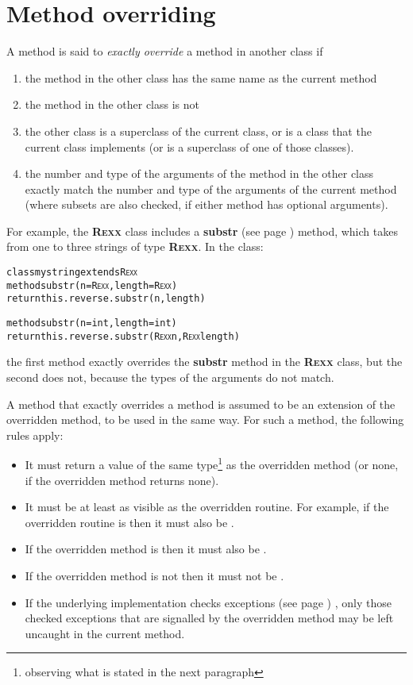 \section{Method overriding}\label{refoverrid}
 
A method is said to \emph{exactly override} a method in another class
if
\begin{enumerate}
\item the method in the other class has the same name as the current method
\item the method in the other class is not 
\item the other class is a superclass of the current class, or is a class
that the current class implements (or is a superclass of one of those
classes).
\item the number and type of the arguments of the method in the other
class exactly match the number and type of the arguments of the current
method (where subsets are also checked, if either method has optional
arguments).
\end{enumerate}
For example, the \textbf{R\textsc{exx}} class includes a
 \textbf{substr} (see page \pageref{refsubstr})  method, which takes from one to
three strings of type \textbf{R\textsc{exx}}.  In the class:
\begin{alltt}
class mystring extends R\textsc{exx}
  method substr(n=R\textsc{exx}, length=R\textsc{exx})
    return this.reverse.substr(n, length)

  method substr(n=int, length=int)
    return this.reverse.substr(R\textsc{exx} n, R\textsc{exx} length)
\end{alltt}
the first method exactly overrides the \textbf{substr} method in
the \textbf{R\textsc{exx}} class, but the second does not, because the types of
the arguments do not match.
 
A method that exactly overrides a method is assumed to be an extension
of the overridden method, to be used in the same way.  For such a
method, the following rules apply:
\begin{itemize}
\item It must return a value of the same type\footnote{observing what
    is stated in the next paragraph} as the overridden method (or
none, if the overridden method returns none).
\item It must be at least as visible as the overridden routine.
For example, if the overridden routine is  then it must
also be .
\item If the overridden method is  then it must also
be .
\item If the overridden method is not  then it must
not be .
\item If the underlying implementation checks  exceptions (see page \pageref{refexcep}) ,
only those checked exceptions that are signalled by the overridden
method may be left uncaught in the current method.
\end{itemize}

